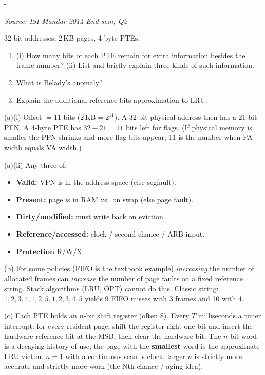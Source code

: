 \documentclass[11pt,a4paper]{article}
\makeatletter
\newcommand{\keepspace}[1]{\par\penalty-100\begingroup
  \setlength{\dimen@}{#1}\dimen@ii\pagegoal\advance\dimen@ii-\pagetotal
  \ifdim\dimen@>\dimen@ii\ifdim\dimen@ii>\z@\vfil\fi\break\fi\endgroup}
\newcounter{qn}[section]
\newenvironment{Qn}[4]{%
  \refstepcounter{qn}\keepspace{7\baselineskip}%
  \begin{tcolorbox}[qboxstyle, title={Q\thesection.\theqn\ \ [#1 \textbar\ #2]\ \ #4}]%
  {\footnotesize\color{g3}\textit{Source: #3}}\par\smallskip%
}{%
  \end{tcolorbox}%
}
\newenvironment{Sol}{%
  \begin{tcolorbox}[sboxstyle, title={Solution}]%
}{%
  \end{tcolorbox}\vspace{0.35em}%
}
\makeatother
\begin{document}
\begin{Qn}{Medium}{Lect 15}{ISI Mandar 2014 End-sem, Q2}{PTE extra bits, Belady's anomaly, and additional-reference-bits LRU}
32-bit addresses, 2\,KB pages, 4-byte PTEs.
\begin{enumerate}
  \item[(a)] (i) How many bits of each PTE remain for extra information
        besides the frame number? (ii) List and briefly explain three
        kinds of such information.
  \item[(b)] What is Belady's anomaly?
  \item[(c)] Explain the additional-reference-bits approximation to LRU.
\end{enumerate}
\end{Qn}
\begin{Sol}
(a)(i) Offset $=11$ bits ($2\,\mathrm{KB}=2^{11}$). A 32-bit physical
address then has a 21-bit PFN. A 4-byte PTE has $32-21=11$ bits left
for flags. (If physical memory is smaller the PFN shrinks and more
flag bits appear; 11 is the number when PA width equals VA width.)

(a)(ii) Any three of:
\begin{itemize}
  \item \textbf{Valid:} VPN is in the address space (else segfault).
  \item \textbf{Present:} page is in RAM vs.\ on swap (else page fault).
  \item \textbf{Dirty/modified:} must write back on eviction.
  \item \textbf{Reference/accessed:} clock / second-chance / ARB input.
  \item \textbf{Protection} R/W/X.
\end{itemize}

(b) For some policies (FIFO is the textbook example) \emph{increasing}
the number of allocated frames can \emph{increase} the number of page
faults on a fixed reference string. Stack algorithms (LRU, OPT) cannot
do this. Classic string: $1,2,3,4,1,2,5,1,2,3,4,5$ yields 9 FIFO
misses with 3 frames and 10 with 4.

(c) Each PTE holds an $n$-bit shift register (often 8). Every $T$
milliseconds a timer interrupt: for every resident page, shift the
register right one bit and insert the hardware reference bit at the
MSB, then clear the hardware bit. The $n$-bit word is a decaying
history of use; the page with the \textbf{smallest} word is the
approximate LRU victim. $n=1$ with a continuous scan is clock;
larger $n$ is strictly more accurate and strictly more work
(the Nth-chance / aging idea).
\end{Sol}
\end{document}
